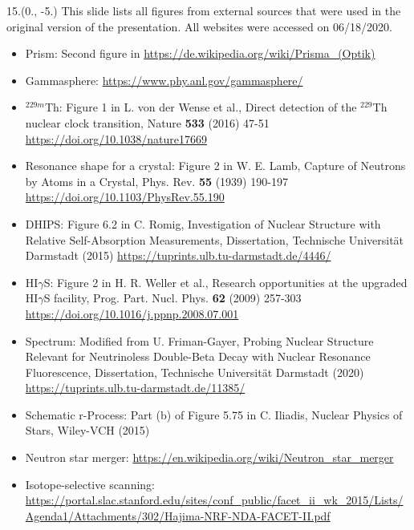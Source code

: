 \begin{textblock}{15.}(0., -5.)
    This slide lists all figures from external sources that were used in the original version of the presentation.
    All websites were accessed on 06/18/2020.

    \begin{itemize}
        \item Prism: Second figure in \url{https://de.wikipedia.org/wiki/Prisma_(Optik)}
        \item Gammasphere: \url{https://www.phy.anl.gov/gammasphere/}
        \item $^{229m}$Th: Figure 1 in L. von der Wense et al., Direct detection of the $^{229}$Th nuclear clock transition, Nature \textbf{533} (2016) 47-51 \url{https://doi.org/10.1038/nature17669}
        \item Resonance shape for a crystal: Figure 2 in W. E. Lamb, Capture of Neutrons by Atoms in a Crystal, Phys. Rev. \textbf{55} (1939) 190-197 \url{https://doi.org/10.1103/PhysRev.55.190}
        \item DHIPS: Figure 6.2 in C. Romig, Investigation of Nuclear Structure with Relative Self-Absorption Measurements, Dissertation, Technische Universit\"at Darmstadt (2015) \url{https://tuprints.ulb.tu-darmstadt.de/4446/}
        \item HI$\gamma$S: Figure 2 in H. R. Weller et al., Research opportunities at the upgraded HI$\gamma$S facility, Prog. Part. Nucl. Phys. \textbf{62} (2009) 257-303 \url{https://doi.org/10.1016/j.ppnp.2008.07.001}
        \item Spectrum: Modified from U. Friman-Gayer, Probing Nuclear Structure Relevant for Neutrinoless Double-Beta Decay with Nuclear Resonance Fluorescence, Dissertation, Technische Universit\"at Darmstadt (2020) \url{https://tuprints.ulb.tu-darmstadt.de/11385/}
        \item Schematic r-Process: Part (b) of Figure 5.75 in C. Iliadis, Nuclear Physics of Stars, Wiley-VCH (2015)
        \item Neutron star merger: \url{https://en.wikipedia.org/wiki/Neutron_star_merger}
        \item Isotope-selective scanning: \url{https://portal.slac.stanford.edu/sites/conf_public/facet_ii_wk_2015/Lists/Agenda1/Attachments/302/Hajima-NRF-NDA-FACET-II.pdf}
    \end{itemize}
\end{textblock}